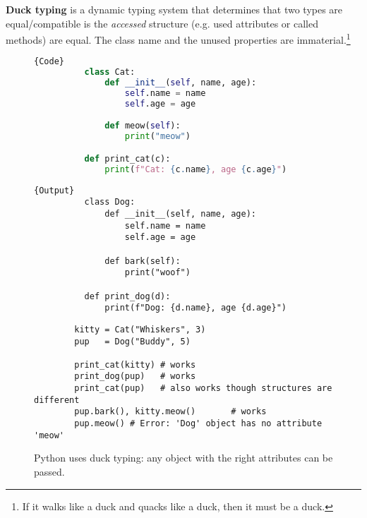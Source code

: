  \begin{definition}
    \textbf{Duck typing} is a dynamic typing system that determines that two types are equal/compatible is the \textit{accessed} structure (e.g. used attributes or called methods) are equal. The class name and the unused properties are immaterial.\footnote{If it walks like a duck and quacks like a duck, then it must be a duck.} 

    \begin{figure}[H]
      \centering 
      \noindent\begin{minipage}{.5\textwidth}
        \begin{lstlisting}[language=python]{Code}
          class Cat:
              def __init__(self, name, age):
                  self.name = name
                  self.age = age 

              def meow(self): 
                  print("meow")

          def print_cat(c):
              print(f"Cat: {c.name}, age {c.age}")
        \end{lstlisting}
      \end{minipage}
      \hfill
      \begin{minipage}{.49\textwidth}
        \begin{lstlisting}[]{Output}
          class Dog:
              def __init__(self, name, age):
                  self.name = name
                  self.age = age

              def bark(self): 
                  print("woof")

          def print_dog(d):
              print(f"Dog: {d.name}, age {d.age}")
        \end{lstlisting}
      \end{minipage}

      \begin{lstlisting}
        kitty = Cat("Whiskers", 3)
        pup   = Dog("Buddy", 5)

        print_cat(kitty) # works
        print_dog(pup)   # works
        print_cat(pup)   # also works though structures are different
        pup.bark(), kitty.meow()       # works  
        pup.meow() # Error: 'Dog' object has no attribute 'meow'
      \end{lstlisting}
      \caption{Python uses duck typing: any object with the right attributes can be passed.} 
      \label{fig:python_duck}
    \end{figure}
  \end{definition} 

